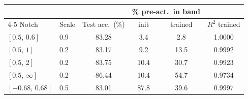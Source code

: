 \begin{tabular}{llcccc}
\toprule
 & & & \multicolumn{2}{c}{\% pre-act.\ in band} & \\
\cmidrule(lr){4-5}
Notch & Scale & Test acc.\ (\%) & init & trained & $R^2$ trained \\
\midrule
$[0.5,\,0.6]$ & 0.9 & 83.28 & 3.4 & 2.8 & 1.0000 \\
$[0.5,\,1]$ & 0.2 & 83.17 & 9.2 & 13.5 & 0.9992 \\
$[0.5,\,2]$ & 0.2 & 83.75 & 10.4 & 30.7 & 0.9923 \\
$[0.5,\,\infty]$ & 0.2 & 86.44 & 10.4 & 54.7 & 0.9734 \\
$[-0.68,\,0.68]$ & 0.5 & 83.01 & 87.8 & 39.6 & 0.9997 \\
\bottomrule
\end{tabular}

